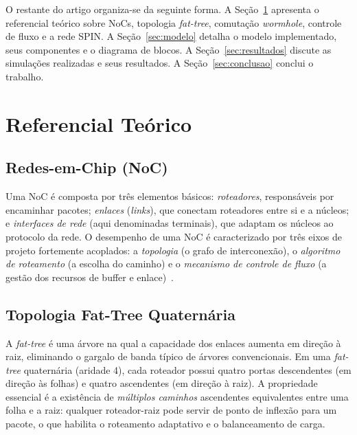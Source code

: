 \documentclass[conference]{IEEEtran}
\begin{document}
O restante do artigo organiza-se da seguinte forma. A
Seção~\ref{sec:teoria} apresenta o referencial teórico sobre NoCs, topologia
\emph{fat-tree}, comutação \emph{wormhole}, controle de fluxo e a rede SPIN. A
Seção~\ref{sec:modelo} detalha o modelo implementado, seus componentes e o
diagrama de blocos. A Seção~\ref{sec:resultados} discute as simulações realizadas
e seus resultados. A Seção~\ref{sec:conclusao} conclui o trabalho.

\section{Referencial Teórico}
\label{sec:teoria}

\subsection{Redes-em-Chip (NoC)}
Uma NoC é composta por três elementos básicos: \emph{roteadores}, responsáveis
por encaminhar pacotes; \emph{enlaces} (\emph{links}), que conectam roteadores
entre si e a núcleos; e \emph{interfaces de rede} (aqui denominadas terminais),
que adaptam os núcleos ao protocolo da rede. O desempenho de uma NoC é
caracterizado por três eixos de projeto fortemente acoplados: a \emph{topologia}
(o grafo de interconexão), o \emph{algoritmo de roteamento} (a escolha do
caminho) e o \emph{mecanismo de controle de fluxo} (a gestão dos recursos de
buffer e enlace)~\cite{dally2004principles}.

\subsection{Topologia Fat-Tree Quaternária}
A \emph{fat-tree} é uma árvore na qual a capacidade dos enlaces aumenta em
direção à raiz, eliminando o gargalo de banda típico de árvores convencionais.
Em uma \emph{fat-tree} quaternária (aridade 4), cada roteador possui quatro
portas descendentes (em direção às folhas) e quatro ascendentes (em direção à
raiz). A propriedade essencial é a existência de \emph{múltiplos caminhos}
ascendentes equivalentes entre uma folha e a raiz: qualquer roteador-raiz pode
servir de ponto de inflexão para um pacote, o que habilita o roteamento
adaptativo e o balanceamento de carga.
\end{document}
